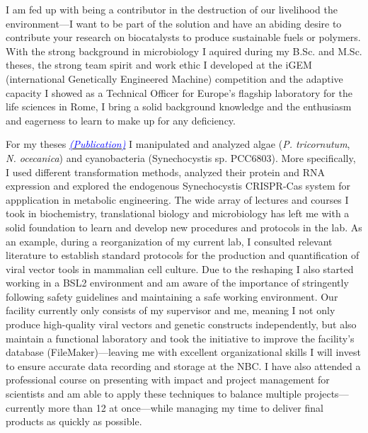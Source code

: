 \documentclass[11pt,a4paper,sans]{moderncv}
\begin{document}

       
\makelettertitle
\begin{spacing}{1.15}

I am fed up with being a contributor in the destruction of our livelihood the environment---I want to be part of the solution and have an abiding desire to contribute your research on biocatalysts to produce sustainable fuels or polymers.
With the strong background in microbiology I aquired during my B.Sc. and M.Sc. theses, the strong team spirit and work ethic I developed at the iGEM (international Genetically Engineered Machine) competition and the adaptive capacity I showed as a Technical Officer for Europe's flagship laboratory for the life sciences in Rome, I bring a solid background knowledge and the enthusiasm and eagerness to learn to make up for any deficiency. 
\par\vspace*{1mm} %

For my theses {\href{https://www.ncbi.nlm.nih.gov/pubmed/29517395}{\textcolor{blue}{{\textit{(Publication)}}}}} I manipulated and analyzed algae (\textit{P. tricornutum}, \textit{N. ocecanica}) and cyanobacteria (Synechocystis sp. PCC6803). 
More specifically, I used different transformation methods, analyzed their protein and RNA expression and explored the endogenous Synechocystis CRISPR-Cas system for appplication in metabolic engineering. 
The wide array of lectures and courses I took in biochemistry, translational biology and microbiology has  left me with a solid foundation to learn and develop new procedures and protocols in the lab. 
As an example, during a reorganization of my current lab, I consulted relevant literature to establish standard protocols for the production and quantification of viral vector tools in mammalian cell culture. 
Due to the reshaping I also started working in a BSL2 environment and am aware of the importance of stringently following safety guidelines and maintaining a safe working environment. 
Our facility currently only consists of my supervisor and me, meaning I not only produce high-quality viral vectors and genetic constructs independently, but also maintain a functional laboratory and took the initiative to improve the facility's database (FileMaker)---leaving me with excellent organizational skills I will invest to ensure accurate data recording and storage at the NBC.  
I have also attended a professional course on presenting with impact and project management for scientists and am able to apply these techniques to balance multiple projects---currently more than 12 at once---while managing my time to deliver final products as quickly as possible.


\end{spacing}
\end{document}
